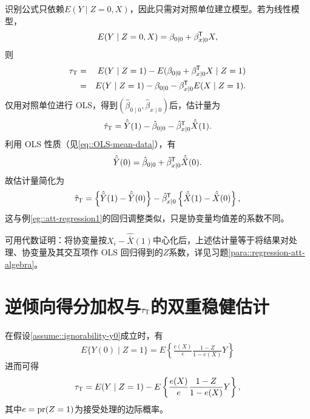 \begin{example}\label{eg::att-regression2}
识别公式只依赖$E(Y\mid Z=0, X)$，因此只需对对照单位建立模型。若为线性模型，
$$
E(Y\mid Z=0, X) =\beta_{0\mid 0}   + \beta_{x\mid 0} ^{\mkern-1.5mu\mathsf{T}} X,
$$
则
\begin{eqnarray*}
\tau_\textsc{T} &=& E(Y\mid Z=1) - E(   \beta_{0\mid 0}   + \beta_{x\mid 0} ^{\mkern-1.5mu\mathsf{T}} X  \mid Z=1 ) \\
&=& E(Y\mid Z=1) -   \beta_{0\mid 0}    -  \beta_{x\mid 0}   ^{\mkern-1.5mu\mathsf{T}} E(X\mid Z=1). 
\end{eqnarray*}
仅用对照单位进行 OLS，得到$( \hat{\beta}_{0\mid 0} ,  \hat{\beta}_{x\mid 0})$后，估计量为
$$
\hat{\tau}_\textsc{T} = \hat{\bar{Y}}(1) -\hat{\beta}_{0\mid 0}  - \hat{\beta}_{x\mid 0}  ^{\mkern-1.5mu\mathsf{T}} \hat{\bar{X}}(1).
$$
利用 OLS 性质（见\ref{eq::OLS-mean-data}），有
$$
\hat{\bar{Y}}(0) = \hat{\beta}_{0\mid 0} + \hat{\beta}_{x\mid 0}  ^{\mkern-1.5mu\mathsf{T}} \hat{\bar{X}}(0).
$$
故估计量简化为
$$
\hat{\tau}_\textsc{T} = \left\{  \hat{\bar{Y}}(1) - \hat{\bar{Y}}(0) \right\} - \hat{\beta}_{x\mid 0}  ^{\mkern-1.5mu\mathsf{T}} \left\{  \hat{\bar{X}}(1) -  \hat{\bar{X}}(0) \right\}, 
$$
这与例\ref{eg::att-regression1}的回归调整类似，只是协变量均值差的系数不同。 

可用代数证明：将协变量按$ X_i  - \hat{\bar{X}}(1)$中心化后，上述估计量等于将结果对处理、协变量及其交互项作 OLS 回归得到的$Z$系数，详见习题\ref{para::regression-att-algebra}。  
\end{example}




\section{逆倾向得分加权与$\tau_\textsc{T} $的双重稳健估计}


\begin{theorem}
\label{thm::ipw-att}
在假设\ref{assume::ignorability-y0}成立时，有
\begin{eqnarray}
E\{ Y(0) \mid Z=1 \} = E\left\{         \frac{e(X)}{e}  \frac{1-Z}{1-e(X)} Y \right\}
\label{eq::ipw-att}
\end{eqnarray}
进而可得
\begin{eqnarray}\label{eq::att-ipw-formula}
\tau_\textsc{T} = E(Y\mid Z=1) -  E\left\{         \frac{e(X)}{e}  \frac{1-Z}{1-e(X)} Y \right\} ,
\end{eqnarray}
其中$e = \textup{pr}(Z=1)$为接受处理的边际概率。
\end{theorem}


